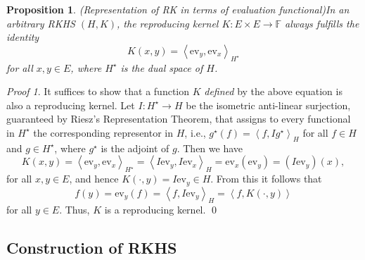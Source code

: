 \documentclass[a4paper,12pt]{article}
\newtheorem{prp}[thm]{Proposition}
\theoremstyle{remark}
\newtheorem*{prf}{Proof}
\theoremstyle{definition}
\theoremstyle{definition}
\theoremstyle{definition}
\newcommand{\ip}[2]{\left<#1, #2 \right>}
\newcommand{\ev}[1]{\mathrm{ev}_{#1}}
\newcommand{\adj}[1]{#1^{\star}}
\begin{document}
\begin{prp} (Representation of RK in terms of evaluation functional)\label{Representation of RK in terms of ev}
	In an arbitrary RKHS \( (H,K) \), the reproducing kernel \( K:E \times E \to \mathbb{F} \) always fulfills the identity
	\begin{equation*}
		K(x,y) = \ip{\ev{y}}{\ev{x}}_{\adj{H}}
	\end{equation*}
	for all \( x,y \in E \), where \( \adj{H} \) is the dual space of \( H \).
\end{prp}
\begin{prf}
	It suffices to show that a function \( K \) \textit{defined} by the above equation is also a reproducing kernel.
	Let \( I:\adj{H}\to H \) be the isometric anti-linear surjection,  guaranteed by Riesz's Representation Theorem, that assigns to every functional in \( \adj{H} \) the corresponding representor in \( H \), i.e., \( \adj{g}(f)=\ip{f}{I \adj{g}}_H \) for all \( f \in H \) and \( g \in \adj{H} \), where \( \adj{g} \) is the adjoint of \( g \). Then we have
	\begin{equation*}
		K(x,y) = \ip{\ev{y}}{\ev{x}}_{\adj{H}}
		= \ip{I \ev{y}}{I \ev{x}}_H
		= \ev{x} \left( \ev{y} \right) = \left( I \ev{y} \right)(x),
	\end{equation*}
	for all \( x,y \in E \), and hence \( K(\cdot ,y) = I \ev{y} \in H \). From this it follows that
	\begin{equation*}
		f(y) = \ev{y}(f) = \ip{f}{I \ev{y}}_H = \ip{f}{K(\cdot ,y)}
	\end{equation*}
	for all \( y \in E \). Thus, \( K \) is a reproducing kernel.
	\qed\end{prf}


\subsection{Construction of RKHS} \label{rkhs of a pd kernel }
\end{document}
